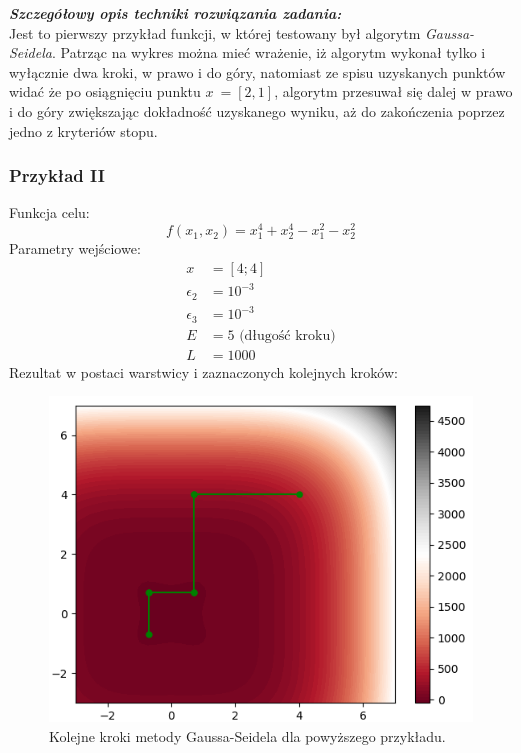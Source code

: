 \documentclass[a4paper,12pt]{article}
\begin{document}
\newline
\textbf{\textit{Szczegółowy opis techniki rozwiązania zadania:}} \\
Jest to pierwszy przykład funkcji, w której testowany był algorytm \textit{Gaussa-Seidela}. Patrząc na wykres można mieć wrażenie, iż algorytm wykonał tylko i wyłącznie dwa kroki, w prawo i do góry, natomiast ze spisu uzyskanych punktów widać że po osiągnięciu punktu $x ~= [2, 1]$, algorytm przesuwał się dalej w prawo i do góry zwiększając dokładność uzyskanego wyniku, aż do zakończenia poprzez jedno z kryteriów stopu.

\subsubsection{Przykład II}
Funkcja celu:
\begin{equation}
    f(x_{1}, x_{2}) = x_{1}^{4} + x_{2}^{4} - x_{1}^{2} - x_{2}^{2}
\end{equation}
Parametry wejściowe:
\begin{align*}
    x &= [4; 4] \\
    \epsilon_{2} &= 10^{-3} \\
    \epsilon_{3} &= 10^{-3} \\
    E &= 5 \mbox{ (długość kroku)}\\
    L &= 1000
\end{align*}
\newpage
Rezultat w postaci warstwicy i zaznaczonych kolejnych kroków:
\begin{figure}[H]
    \centering
    \includegraphics[width=\textwidth]{images/gs_plot2.png}
    \caption{Kolejne kroki metody Gaussa-Seidela dla powyższego przykładu.}
    \label{uml_gauss_seidel}
\end{figure}
\end{document}
